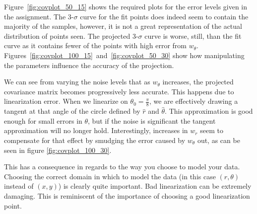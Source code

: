 \documentclass[12pt]{article}
\begin{document}
Figure~\ref{fig:covplot_50_15} shows the required plots for the error levels given
in the assignment. The 3-$\sigma$ curve for the fit points does indeed seem to contain
the majority of the samples, however, it is not a great representation of the actual distribution
of points seen. The projected 3-$\sigma$ curve is worse, still, than the fit curve as
it contains fewer of the points with high error from $w_\theta$.
Figures~\ref{fig:covplot_100_15}~and~\ref{fig:covplot_50_30} show how manipulating the
parameters influence the accuracy of the projection.

We can see from varying the noise levels that as $w_\theta$ increases, the projected
covariance matrix becomes progressively less accurate. This happens due to
linearization error. When we linearize on $\theta_0=\frac{\pi}{8}$, we are effectively
drawing a tangent at that angle of the circle defined by $\hat{r}$ and $\hat{\theta}$.
This approximation is good enough for
small errors in $\theta$, but if the noise is significant the tangent approximation
will no longer hold. Interestingly, increases in $w_r$ seem to compensate for that
effect by smudging the error caused by $w_{\theta}$ out, as can be seen in figure
\ref{fig:covplot_100_30}.

This has a consequence in regards to the way you choose to model your data.
Choosing the correct domain in which to model the data (in this case $(r,\theta)$ instead of
$(x,y)$) is clearly quite important. Bad linearization can be extremely damaging.
This is reminiscent of the importance of choosing a good linearization point.
\end{document}
